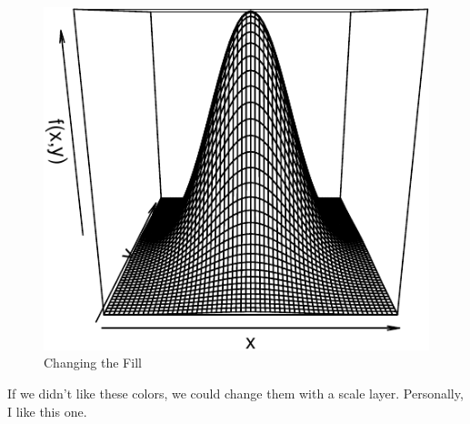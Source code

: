 \documentclass[
  12pt,
  krantz2]{krantz}
\makeatletter
\newenvironment{Shaded}{\begin{snugshade}}{\end{snugshade}}
\newcommand{\AttributeTok}[1]{\textcolor[rgb]{0.61,0.61,0.61}{#1}}
\newcommand{\DecValTok}[1]{\textcolor[rgb]{0.06,0.06,0.06}{#1}}
\newcommand{\FunctionTok}[1]{\textcolor[rgb]{0,0,0}{#1}}
\newcommand{\NormalTok}[1]{#1}
\newcommand{\OtherTok}[1]{\textcolor[rgb]{0.37,0.37,0.37}{#1}}
\newcommand{\SpecialCharTok}[1]{\textcolor[rgb]{0,0,0}{#1}}
\newenvironment{kframe}{%
\medskip{}
\setlength{\fboxsep}{.8em}
 \def\at@end@of@kframe{}%
 \ifinner\ifhmode%
  \def\at@end@of@kframe{\end{minipage}}%
  \begin{minipage}{\columnwidth}%
 \fi\fi%
 \def\FrameCommand##1{\hskip\@totalleftmargin \hskip-\fboxsep
 \colorbox{shadecolor}{##1}\hskip-\fboxsep
     \hskip-\linewidth \hskip-\@totalleftmargin \hskip\columnwidth}%
 \MakeFramed {\advance\hsize-\width
   \@totalleftmargin\z@ \linewidth\hsize
   \@setminipage}}%
 {\par\unskip\endMakeFramed%
 \at@end@of@kframe}
\renewenvironment{Shaded}{\begin{kframe}}{\end{kframe}}
\makeatother
\begin{document}
\begin{figure}

{\centering \includegraphics[width=0.8\linewidth]{r_and_python_book_files/figure-latex/unnamed-chunk-224-1} 

}

\caption{Changing the Fill}\label{fig:unnamed-chunk-224}
\end{figure}

If we didn't like these colors, we could change them with a scale layer. Personally, I like this one.

\begin{Shaded}
\end{Shaded}
\end{document}
